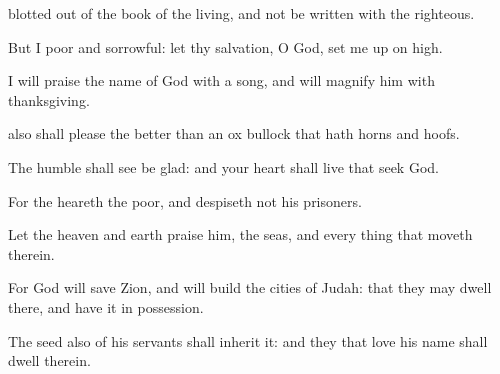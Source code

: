 {blotted out of the
book of the
living, and not be
written with the
righteous.
\par }{\Q {}But I
{}
poor and
sorrowful: let thy
salvation, O
God, set me up on
high.
\par }{\BB \par }{\Q {}I will
praise the
name of
God with a
song, and will
magnify him with
thanksgiving.
\par }{\Q {} also shall
please the
{}
better than an
ox
{}
bullock that hath
horns and
hoofs.
\par }{\Q {}The
humble shall
see
{} be
glad: and your
heart shall
live that
seek
God.
\par }{\Q {}For the
{}
heareth the
poor, and
despiseth not his
prisoners.
\par }{\Q {}Let the
heaven and
earth
praise him, the
seas, and every thing that
moveth therein.
\par }{\Q {}For
God will
save
Zion, and will
build the
cities of
Judah: that they may
dwell there, and have it in
possession.
\par }{\Q {}The
seed also of his
servants shall
inherit it: and they that
love his
name shall
dwell therein.

\par }
